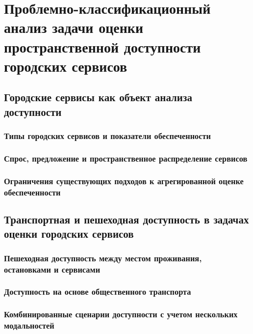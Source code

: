 \chapter{Проблемно-классификационный анализ задачи оценки пространственной доступности городских сервисов}
\label{ch:problem-analysis}

\section{Городские сервисы как объект анализа доступности}
\label{sec:urban-services}

\subsection{Типы городских сервисов и показатели обеспеченности}
\label{subsec:service-types}

\subsection{Спрос, предложение и пространственное распределение сервисов}
\label{subsec:demand-supply-space}

\subsection{Ограничения существующих подходов к агрегированной оценке обеспеченности}
\label{subsec:provision-limitations}

\section{Транспортная и пешеходная доступность в задачах оценки городских сервисов}
\label{sec:transport-walk-access}

\subsection{Пешеходная доступность между местом проживания, остановками и сервисами}
\label{subsec:first-last-mile}

\subsection{Доступность на основе общественного транспорта}
\label{subsec:pt-accessibility}

\subsection{Комбинированные сценарии доступности с учетом нескольких модальностей}
\label{subsec:multimodal-access}

